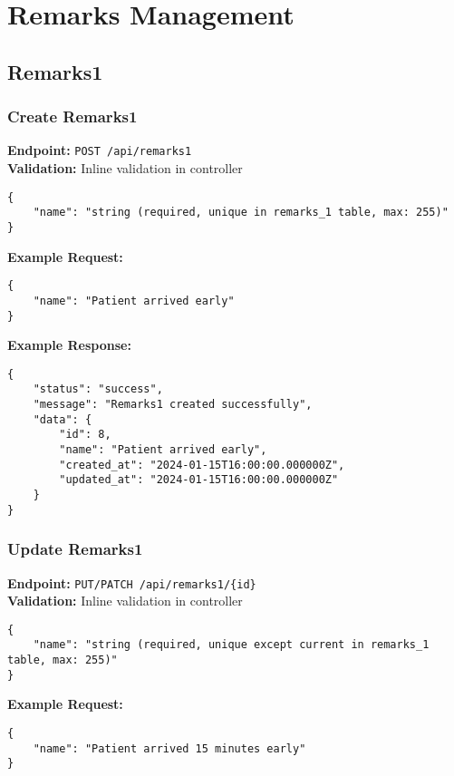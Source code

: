 \documentclass[12pt,a4paper]{article}
\begin{document}
\section{Remarks Management}

\subsection{Remarks1}

\subsubsection{Create Remarks1}
\textbf{Endpoint:} \texttt{POST /api/remarks1}\\
\textbf{Validation:} Inline validation in controller

\begin{lstlisting}[caption=Create Remarks1 Request Body]
{
    "name": "string (required, unique in remarks_1 table, max: 255)"
}
\end{lstlisting}

\textbf{Example Request:}
\begin{lstlisting}[caption=Create Remarks1 Example Request]
{
    "name": "Patient arrived early"
}
\end{lstlisting}

\textbf{Example Response:}
\begin{lstlisting}[caption=Create Remarks1 Example Response]
{
    "status": "success",
    "message": "Remarks1 created successfully",
    "data": {
        "id": 8,
        "name": "Patient arrived early",
        "created_at": "2024-01-15T16:00:00.000000Z",
        "updated_at": "2024-01-15T16:00:00.000000Z"
    }
}
\end{lstlisting}

\subsubsection{Update Remarks1}
\textbf{Endpoint:} \texttt{PUT/PATCH /api/remarks1/\{id\}}\\
\textbf{Validation:} Inline validation in controller

\begin{lstlisting}[caption=Update Remarks1 Request Body]
{
    "name": "string (required, unique except current in remarks_1 table, max: 255)"
}
\end{lstlisting}

\textbf{Example Request:}
\begin{lstlisting}[caption=Update Remarks1 Example Request]
{
    "name": "Patient arrived 15 minutes early"
}
\end{lstlisting}
\end{document}
